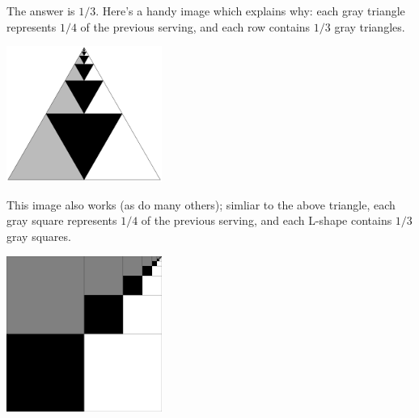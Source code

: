 


The answer is \(1/3\). Here's a handy image which explains why: each gray
triangle represents \(1/4\) of the previous serving, and each row
contains \(1/3\) gray triangles.

\begin{center}
\includegraphics[width=2in]{assets/andy/series4n-1}
\end{center}

This image also works (as do many others); simliar to the above triangle,
each gray square represents \(1/4\) of the previous serving, and each
L-shape contains \(1/3\) gray squares.

\begin{center}
\includegraphics[width=2in]{assets/andy/series4n-2}
\end{center}
